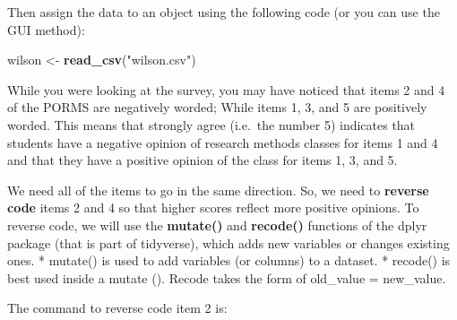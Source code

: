 \documentclass[
]{book}
\newenvironment{Shaded}{\begin{snugshade}}{\end{snugshade}}
\newcommand{\DataTypeTok}[1]{\textcolor[rgb]{0.13,0.29,0.53}{#1}}
\newcommand{\DecValTok}[1]{\textcolor[rgb]{0.00,0.00,0.81}{#1}}
\newcommand{\KeywordTok}[1]{\textcolor[rgb]{0.13,0.29,0.53}{\textbf{#1}}}
\newcommand{\NormalTok}[1]{#1}
\newcommand{\OperatorTok}[1]{\textcolor[rgb]{0.81,0.36,0.00}{\textbf{#1}}}
\newcommand{\StringTok}[1]{\textcolor[rgb]{0.31,0.60,0.02}{#1}}
\begin{document}
Then assign the data to an object using the following code (or you can use the GUI method):

\begin{Shaded}
\begin{Highlighting}[]
\NormalTok{wilson <-}\StringTok{ }\KeywordTok{read_csv}\NormalTok{(}\StringTok{"wilson.csv"}\NormalTok{) }
\end{Highlighting}
\end{Shaded}

While you were looking at the survey, you may have noticed that items 2 and 4 of the PORMS are negatively worded; While items 1, 3, and 5 are positively worded. This means that strongly agree (i.e.~the number 5) indicates that students have a negative opinion of research methods classes for items 1 and 4 and that they have a positive opinion of the class for items 1, 3, and 5.

We need all of the items to go in the same direction. So, we need to \textbf{reverse code} items 2 and 4 so that higher scores reflect more positive opinions. To reverse code, we will use the \textbf{mutate()} and \textbf{recode()} functions of the dplyr package (that is part of tidyverse), which adds new variables or changes existing ones.
* mutate() is used to add variables (or columns) to a dataset.
* recode() is best used inside a mutate (). Recode takes the form of old\_value = new\_value.

The command to reverse code item 2 is:

\begin{Shaded}
\end{Shaded}
\end{document}
